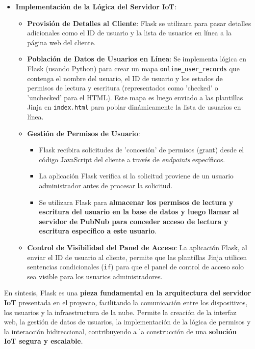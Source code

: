 \documentclass{report}
\begin{document}
\begin{itemize}
    \item \textbf{Implementación de la Lógica del Servidor IoT}:
    \begin{itemize}
        \item \textbf{Provisión de Detalles al Cliente}: Flask se utilizara para pasar detalles adicionales como el ID de usuario y la 
        lista de usuarios en línea a la página web del cliente.
        \item \textbf{Población de Datos de Usuarios en Línea}: Se implementa lógica en Flask (usando Python) para crear un mapa 
        \verb|online_user_records| que contenga el nombre del usuario, el ID de usuario y los estados de permisos de lectura y escritura 
        (representados como 'checked' o 'unchecked' para el HTML). Este mapa es luego enviado a las plantillas Jinja en \verb|index.html| 
        para poblar dinámicamente la lista de usuarios en línea.
        \item \textbf{Gestión de Permisos de Usuario}:
        \begin{itemize}
            \item Flask recibira solicitudes de 'concesión' de permisos (grant) desde el código JavaScript del cliente a través de 
            \textit{endpoints} específicos.
            \item La aplicación Flask verifica si la solicitud proviene de un usuario administrador antes de procesar la solicitud.
            \item Se utilizara Flask para \textbf{almacenar los permisos de lectura y escritura del usuario en la base de datos y luego 
            llamar al servidor de PubNub para conceder acceso de lectura y escritura específico a este usuario}.
        \end{itemize}
        \item \textbf{Control de Visibilidad del Panel de Acceso}: La aplicación Flask, al enviar el ID de usuario al cliente, permite 
        que las plantillas Jinja utilicen sentencias condicionales (\verb|if|) para que el panel de control de acceso solo sea visible 
        para los usuarios administradores.
    \end{itemize}
\end{itemize}
En síntesis, Flask es una \textbf{pieza fundamental en la arquitectura del servidor IoT} presentada en el proyecto, facilitando la 
comunicación entre los dispositivos, los usuarios y la infraestructura de la nube. Permite la creación de la interfaz web, la gestión de 
datos de usuarios, la implementación de la lógica de permisos y la interacción bidireccional, contribuyendo a la construcción de una 
\textbf{solución IoT segura y escalable}.
\end{document}

